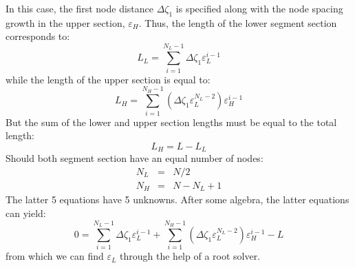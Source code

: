 \documentclass{warpdoc}
\newcommand{\mfd}{\displaystyle}
\begin{document}
In this case, the first node distance $\Delta \zeta_1$
is specified along with the node spacing growth in the
upper section, $\varepsilon_H$. Thus, the length of the lower
segment section corresponds to:
%
\begin{equation}
 L_L=\mfd\sum_{i=1}^{N_L-1} \Delta \zeta_1 \varepsilon_L^{i-1} 
\end{equation}
%
while the length of the upper section is equal to:
%
\begin{equation}
 L_H=\mfd\sum_{i=1}^{N_H-1} \left( \Delta \zeta_1 \varepsilon_L^{N_L-2}  \right) \varepsilon_H^{i-1} 
\end{equation}
%
But the sum of the lower and upper section lengths must be equal to the total length:
%
\begin{equation}
L_H=L-L_L 
\end{equation}
%
Should both segment section have an equal number of nodes:
%
\begin{eqnarray}
  N_L&=&N/2 \\
  N_H&=&N-N_L+1
\end{eqnarray}
%
The latter 5 equations have 5 unknowns. After some algebra, the latter equations can yield:
%
\begin{equation}
0=\mfd\sum_{i=1}^{N_L-1} \Delta \zeta_1 \varepsilon_L^{i-1}
+\mfd\sum_{i=1}^{N_H-1} \left( \Delta \zeta_1 \varepsilon_L^{N_L-2}  \right) \varepsilon_H^{i-1}
-L
\end{equation}
%
from which we can find $\varepsilon_L$ through the help of a root solver.

%  
%  
%  
\end{document}
